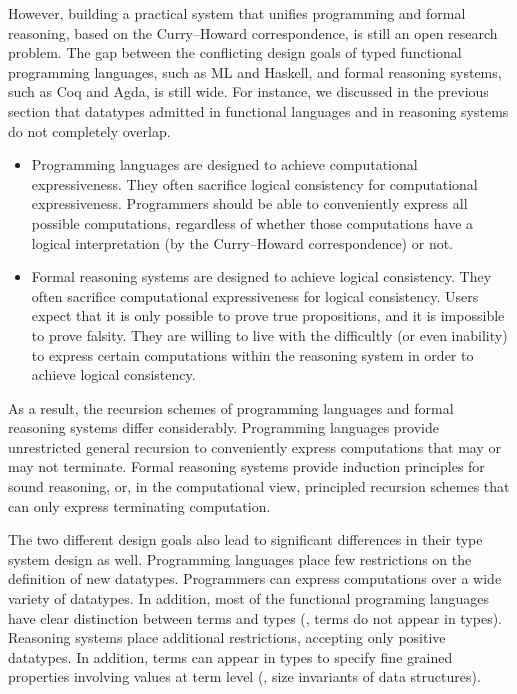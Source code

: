 However, building a practical system that unifies programming and
formal reasoning, based on the Curry--Howard correspondence, is still
an open research problem. The gap between the conflicting design goals of
typed functional programming languages, such as ML and Haskell,
and formal reasoning systems, such as Coq and Agda, is still wide.
For instance, we discussed in the previous section that datatypes admitted
in functional languages and in reasoning systems do not completely overlap.

\begin{itemize}

\item
Programming languages are designed to achieve computational expressiveness.
They often sacrifice logical consistency for computational expressiveness.
Programmers should be able to conveniently express all possible computations,
regardless of whether those computations have a logical interpretation
(by the Curry--Howard correspondence) or not.

\item
Formal reasoning systems are designed to achieve logical consistency.
They often sacrifice computational expressiveness for logical consistency.
Users expect that it is only possible to prove true propositions,
and it is impossible to prove falsity. They are willing to live with
the difficultly (or even inability) to express certain computations
within the reasoning system in order to achieve logical consistency.

\end{itemize}

As a result, the recursion schemes of programming languages and
formal reasoning systems differ considerably.
Programming languages provide unrestricted general recursion
to conveniently express computations that may or may not terminate.
Formal reasoning systems provide induction principles for sound reasoning,
or, in the computational view, principled recursion schemes that can only
express terminating computation.

The two different design goals also lead to significant differences
in their type system design as well. Programming languages place
few restrictions on the definition of new datatypes. Programmers can
express computations over a wide variety of datatypes. In addition,
most of the functional programing languages have clear distinction between
terms and types (\ie, terms do not appear in types).
Reasoning systems place additional restrictions, accepting only
positive datatypes. In addition, terms can appear in types to specify
fine grained properties involving values at term level
(\eg, size invariants of data structures).

